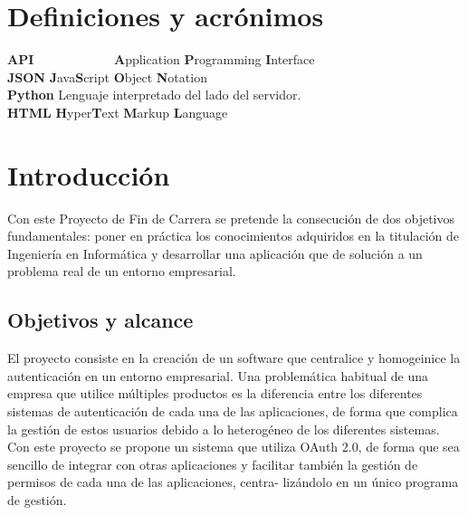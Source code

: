 \documentclass[12pt,a4paperpaper,]{report}
\begin{document}
\chapter*{Definiciones y acrónimos}\label{definiciones-y-acruxf3nimos}

\begin{tabbing}
\textbf{API}~~~~~~~~~~~~ \= \textbf{A}pplication \textbf{P}rogramming \textbf{I}nterface \\  
\textbf{JSON} \> \textbf{J}ava\textbf{S}cript \textbf{O}bject \textbf{N}otation \\  
\textbf{Python} \> Lenguaje interpretado del lado del servidor. \\
\textbf{HTML} \> \textbf{H}yper\textbf{T}ext \textbf{M}arkup \textbf{L}anguage \\ 
\end{tabbing}

\newpage

\setcounter{page}{1} \renewcommand{\thepage}{\arabic{page}}

\chapter{Introducción}\label{introducciuxf3n}

Con este Proyecto de Fin de Carrera se pretende la consecución de dos
objetivos fundamentales: poner en práctica los conocimientos adquiridos
en la titulación de Ingeniería en Informática y desarrollar una
aplicación que de solución a un problema real de un entorno empresarial.

\section{Objetivos y alcance}\label{objetivos-y-alcance}

El proyecto consiste en la creación de un software que centralice y
homogeinice la autenticación en un entorno empresarial. Una problemática
habitual de una empresa que utilice múltiples productos es la diferencia
entre los diferentes sistemas de autenticación de cada una de las
aplicaciones, de forma que complica la gestión de estos usuarios debido
a lo heterogéneo de los diferentes sistemas. Con este proyecto se
propone un sistema que utiliza OAuth 2.0, de forma que sea sencillo de
integrar con otras aplicaciones y facilitar también la gestión de
permisos de cada una de las aplicaciones, centra- lizándolo en un único
programa de gestión.
\end{document}
